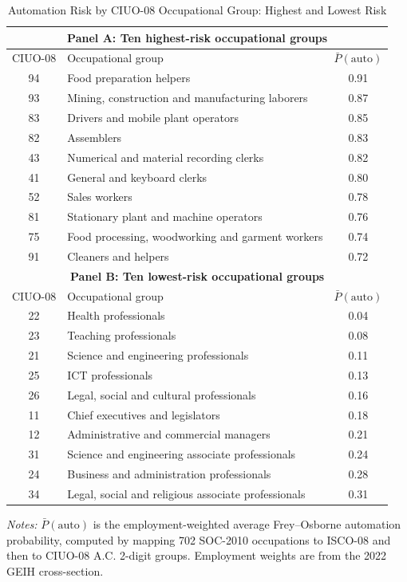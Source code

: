 \documentclass[5p,times,authoryear]{elsarticle}
\begin{document}
\begin{table}[htbp]
\centering
\begin{threeparttable}
\caption{Automation Risk by CIUO-08 Occupational Group: Highest and Lowest Risk}
\label{tab:occupation_mapping}
\small
\setlength{\tabcolsep}{5pt}
\begin{tabular}{@{}clc@{}}
\toprule
\multicolumn{3}{c}{\textbf{Panel A: Ten highest-risk occupational groups}} \\
\midrule
CIUO-08 & Occupational group & $\bar{P}(\text{auto})$ \\
\midrule
94 & Food preparation helpers & 0.91 \\
93 & Mining, construction and manufacturing laborers & 0.87 \\
83 & Drivers and mobile plant operators & 0.85 \\
82 & Assemblers & 0.83 \\
43 & Numerical and material recording clerks & 0.82 \\
41 & General and keyboard clerks & 0.80 \\
52 & Sales workers & 0.78 \\
81 & Stationary plant and machine operators & 0.76 \\
75 & Food processing, woodworking and garment workers & 0.74 \\
91 & Cleaners and helpers & 0.72 \\
\midrule
\multicolumn{3}{c}{\textbf{Panel B: Ten lowest-risk occupational groups}} \\
\midrule
CIUO-08 & Occupational group & $\bar{P}(\text{auto})$ \\
\midrule
22 & Health professionals & 0.04 \\
23 & Teaching professionals & 0.08 \\
21 & Science and engineering professionals & 0.11 \\
25 & ICT professionals & 0.13 \\
26 & Legal, social and cultural professionals & 0.16 \\
11 & Chief executives and legislators & 0.18 \\
12 & Administrative and commercial managers & 0.21 \\
31 & Science and engineering associate professionals & 0.24 \\
24 & Business and administration professionals & 0.28 \\
34 & Legal, social and religious associate professionals & 0.31 \\
\bottomrule
\end{tabular}
\begin{tablenotes}
\footnotesize
\item \textit{Notes:} $\bar{P}(\text{auto})$ is the employment-weighted average Frey--Osborne automation probability, computed by mapping 702 SOC-2010 occupations to ISCO-08 and then to CIUO-08 A.C. 2-digit groups. Employment weights are from the 2022 GEIH cross-section.
\end{tablenotes}
\end{threeparttable}
\end{table}
\end{document}
